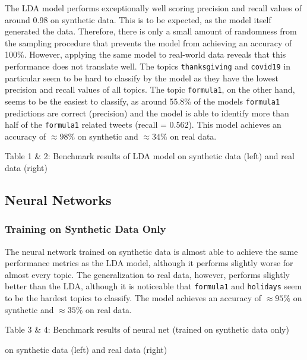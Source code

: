 \documentclass[11pt]{article}
\begin{document}
The LDA model performs exceptionally well scoring precision and recall values of around 0.98 on synthetic data. This is to be expected, as the model itself generated the data. Therefore, there is only a small amount of randomness from the sampling procedure that prevents the model from achieving an accuracy of 100\%. However, applying the same model to real-world data reveals that this performance does not translate well. The topics \texttt{thanksgiving} and \texttt{covid19} in particular seem to be hard to classify by the model as they have the lowest precision and recall values of all topics. The topic \texttt{formula1}, on the other hand, seems to be the easiest to classify, as around 55.8\% of the models \texttt{formula1} predictions are correct (precision) and the model is able to identify more than half of the \texttt{formula1} related tweets (recall = 0.562).
This model achieves an accuracy of $\approx 98\%$ on synthetic and $\approx 34\%$ on real data.

\begin{center}

\qquad

\end{center}
\begin{center}
Table 1 \& 2: Benchmark results of LDA model on synthetic data (left) and real data (right)
\end{center}

\subsection{Neural Networks}
\subsubsection{Training on Synthetic Data Only}
The neural network trained on synthetic data is almost able to achieve the same performance metrics as the LDA model, although it performs slightly worse for almost every topic. The generalization to real data, however, performs slightly better than the LDA, although it is noticeable that \texttt{formula1} and \texttt{holidays} seem to be the hardest topics to classify.
The model achieves an accuracy of $\approx 95\%$ on synthetic and $\approx 35\%$ on real data.

\begin{center}
	
\qquad

\end{center}
\begin{center}
Table 3 \& 4: Benchmark results of neural net (trained on synthetic data only) 

on synthetic data (left) and real data (right)
\end{center}
\end{document}
